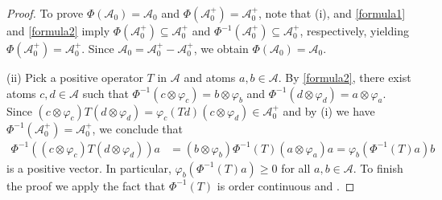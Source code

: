 \documentclass[10pt,a4paper]{amsart}
\begin{document}
\begin{proof}
To prove $\Phi(\mathscr A_0)=\mathscr A_0$ and $\Phi(\mathscr A_0^+)=\mathscr A_0^+$, note that (i), and \eqref{formula1} and \eqref{formula2} imply
$\Phi(\mathscr A_0^+)\subseteq  \mathscr A_0^+$ and $\Phi^{-1}(\mathscr A_0^+)\subseteq \mathscr A_0^+$, respectively, yielding $\Phi(\mathscr A_0^+)=\mathscr A_0^+$. Since $\mathscr A_0=\mathscr A_0^+-\mathscr A_0^+$, we obtain $\Phi(\mathscr A_0)=\mathscr A_0$.

(ii) Pick a positive operator $T$ in $\mathscr A$ and atoms $a,b\in \mathcal A$. By \eqref{formula2}, there exist atoms $c,d\in \mathcal A$ such that
$\Phi^{-1}(c\otimes \varphi_c)=b\otimes \varphi_b$ and $\Phi^{-1}(d\otimes \varphi_d)=a\otimes \varphi_a$.
Since $(c\otimes \varphi_c)T(d\otimes \varphi_d)=\varphi_c(Td)(c\otimes \varphi_d) \in \mathscr A_0^+$ and by (i) we have $\Phi^{-1}(\mathscr A_0^+)=\mathscr A_0^+$, we conclude that
\begin{align*}
\Phi^{-1}((c\otimes \varphi_c)T(d\otimes \varphi_d))a&=(b\otimes \varphi_b)\Phi^{-1}(T)(a\otimes \varphi_a)a=\varphi_b(\Phi^{-1}(T)a)b
\end{align*}
is a positive vector. In particular, $\varphi_b(\Phi^{-1}(T)a)\geq 0$ for all $a,b\in \mathcal A$. To finish the proof we apply the fact that $\Phi^{-1}(T)$ is order continuous and . 
\end{proof}
\end{document}
